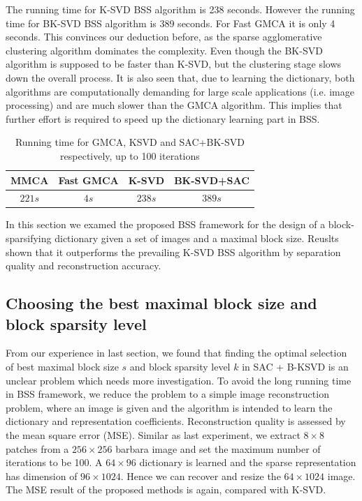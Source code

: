 The running time for K-SVD BSS algorithm is 238 seconds. However the running time for BK-SVD BSS algorithm is 389 seconds. For Fast GMCA it is only 4 seconds. This convinces our deduction before, as the sparse agglomerative clustering algorithm dominates the complexity. Even though the BK-SVD algorithm is supposed to be faster than K-SVD, but the clustering stage slows down the overall process. It is also seen that, due to learning the dictionary, both algorithms are computationally demanding for large scale applications (i.e. image processing) and are much slower than the GMCA algorithm. This implies that further effort is required to speed up the dictionary learning part in BSS. \\
\begin{table}[!htbp]
\centering
    \begin{tabular}{|c|c|c|c|}
    \hline
    MMCA & Fast GMCA & K-SVD & BK-SVD+SAC \\\hline
    $221s$ & $4s$ & $238s$ & $389s$ \\\hline
    \end{tabular}
    \caption{Running time for GMCA, KSVD and SAC+BK-SVD respectively, up to 100 iterations}
\end{table}

In this section we examed the proposed BSS framework for the design of a block-sparsifying dictionary given a set of images and a maximal block size. Reuslts shown that it outperforms the prevailing K-SVD BSS algorithm by separation quality and reconstruction accuracy.

\subsection{Choosing the best maximal block size and block sparsity level}
From our experience in last section, we found that finding the optimal selection of best maximal block size $s$ and block sparsity level $k$ in SAC + B-KSVD is an unclear problem which needs more investigation. To avoid the long running time in BSS framework, we reduce the problem to a simple image reconstruction problem, where an image is given and the algorithm is intended to learn the dictionary and representation coefficients. Reconstruction quality is assessed by the mean square error (MSE). Similar as last experiment, we extract $8 \times 8$ patches from a $256 \times 256$ barbara image and set the maximum number of iterations to be 100. A $64 \times 96$ dictionary is learned and the sparse representation has dimension of $96\times1024$. Hence we can recover and resize the $64\times1024$ image. The MSE result of the proposed methods is again, compared with K-SVD.\\

